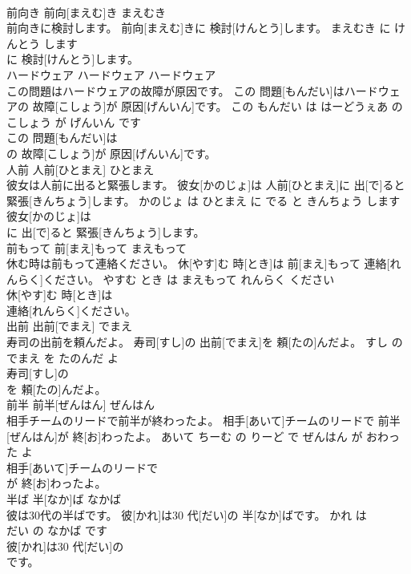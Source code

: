 \documentclass[8pt]{extreport}
\begin{document}
\begin{CJK}{UTF8}{min}
\\	前向き	前向[まえむ]き	まえむき	
\\	前向きに検討します。	前向[まえむ]きに 検討[けんとう]します。	まえむき に けんとう します	
\\	に 検討[けんとう]します。			
\\	ハードウェア	ハードウェア	ハードウェア	
\\	この問題はハードウェアの故障が原因です。	この 問題[もんだい]はハードウェアの 故障[こしょう]が 原因[げんいん]です。	この もんだい は はーどうぇあ の こしょう が げんいん です	
\\	この 問題[もんだい]は
\\	の 故障[こしょう]が 原因[げんいん]です。			
\\	人前	人前[ひとまえ]	ひとまえ	
\\	彼女は人前に出ると緊張します。	彼女[かのじょ]は 人前[ひとまえ]に 出[で]ると 緊張[きんちょう]します。	かのじょ は ひとまえ に でる と きんちょう します	
\\	彼女[かのじょ]は
\\	に 出[で]ると 緊張[きんちょう]します。			
\\	前もって	前[まえ]もって	まえもって	
\\	休む時は前もって連絡ください。	休[やす]む 時[とき]は 前[まえ]もって 連絡[れんらく]ください。	やすむ とき は まえもって れんらく ください	
\\	休[やす]む 時[とき]は
\\	連絡[れんらく]ください。			
\\	出前	出前[でまえ]	でまえ	
\\	寿司の出前を頼んだよ。	寿司[すし]の 出前[でまえ]を 頼[たの]んだよ。	すし の でまえ を たのんだ よ	
\\	寿司[すし]の
\\	を 頼[たの]んだよ。			
\\	前半	前半[ぜんはん]	ぜんはん	
\\	相手チームのリードで前半が終わったよ。	相手[あいて]チームのリードで 前半[ぜんはん]が 終[お]わったよ。	あいて ちーむ の りーど で ぜんはん が おわった よ	
\\	相手[あいて]チームのリードで
\\	が 終[お]わったよ。			
\\	半ば	半[なか]ば	なかば	
\\	彼は30代の半ばです。	彼[かれ]は30 代[だい]の 半[なか]ばです。	かれ は 
\\	だい の なかば です	
\\	彼[かれ]は30 代[だい]の
\\	です。			

\end{CJK}
\end{document}
